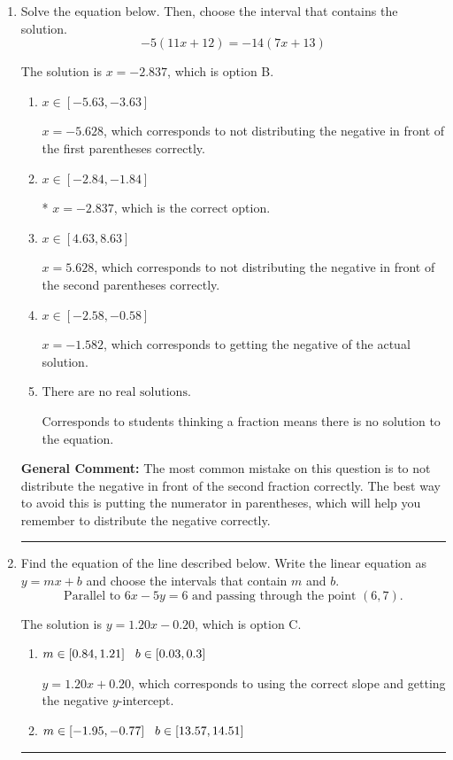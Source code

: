 \documentclass{extbook}[14pt]
\newcommand{\litem}[1]{\item #1

\rule{\textwidth}{0.4pt}}
\begin{document}
\begin{enumerate}\litem{
Solve the equation below. Then, choose the interval that contains the solution.
\[ -5(11x + 12) = -14(7x + 13) \]

The solution is \( x = -2.837 \), which is option B.\begin{enumerate}[label=\Alph*.]
\item \( x \in [-5.63, -3.63] \)

$x = -5.628$, which corresponds to not distributing the negative in front of the first parentheses correctly.
\item \( x \in [-2.84, -1.84] \)

* $x = -2.837$, which is the correct option.
\item \( x \in [4.63, 8.63] \)

$x = 5.628$, which corresponds to not distributing the negative in front of the second parentheses correctly.
\item \( x \in [-2.58, -0.58] \)

$x = -1.582$, which corresponds to getting the negative of the actual solution.
\item \( \text{There are no real solutions.} \)

Corresponds to students thinking a fraction means there is no solution to the equation.
\end{enumerate}

\textbf{General Comment:} The most common mistake on this question is to not distribute the negative in front of the second fraction correctly. The best way to avoid this is putting the numerator in parentheses, which will help you remember to distribute the negative correctly.
}
\litem{
Find the equation of the line described below. Write the linear equation as $ y=mx+b $ and choose the intervals that contain $m$ and $b$.
\[ \text{Parallel to } 6 x - 5 y = 6 \text{ and passing through the point } (6, 7). \]

The solution is \( y = 1.20x - 0.20 \), which is option C.\begin{enumerate}[label=\Alph*.]
\item \( m \in [0.84, 1.21] \hspace*{3mm} b \in [0.03, 0.3] \)

 $y = 1.20x + 0.20$, which corresponds to using the correct slope and getting the negative $y$-intercept.
\item \( m \in [-1.95, -0.77] \hspace*{3mm} b \in [13.57, 14.51] \)


\end{enumerate}}
\end{enumerate}
\end{document}
